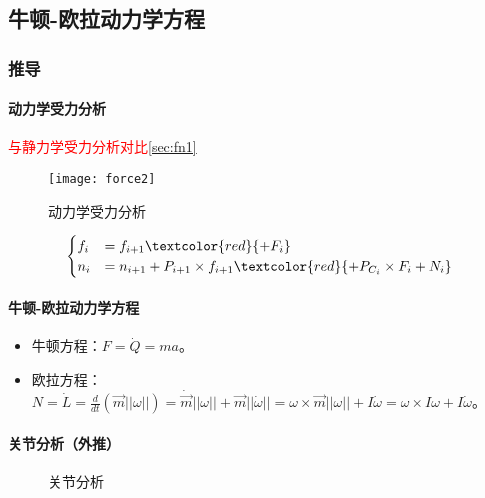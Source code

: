 \documentclass[
12pt, %
a4paper, 
oneside, %
headinclude,footinclude, %
]{scrartcl}
\begin{document}
\subsection[牛顿-欧拉动力学方程]{牛顿-欧拉动力学方程}
\subsubsection[推导]{推导}
\paragraph{动力学受力分析}\label{sec:fn2}
\textcolor{red}{与静力学受力分析对比}\ref{sec:fn1}

\begin{figure}[H]
\centering 
\texttt{[image: force2]} 
\caption[动力学受力分析]{动力学受力分析}
\end{figure}

$$
\begin{cases}
f_i &= f_{i + 1} \textcolor{red}{+ F_i} \\
n_i &= n_{i + 1} + P_{i + 1} \times f_{i + 1} \textcolor{red}{+ P_{C_i} \times F_i + N_i} \\
\end{cases}
$$
\paragraph{牛顿-欧拉动力学方程}
\begin{itemize}
\item 牛顿方程：$ F = \dot{Q} = ma $。
\item 欧拉方程：$ N = \dot{L} = \frac{d}{dt}(\vec{m}||\omega||) = \dot{\vec{m}}||\omega|| + \vec{m}||\dot{\omega}|| = \omega \times \vec{m}||\omega|| + I\dot{\omega} = \omega \times I\omega + I\dot{\omega} $。
\end{itemize}
\paragraph{关节分析（外推）}
\begin{figure}[H]
\centering
{} \quad
{}
\caption[关节分析]{关节分析}
\end{figure}
\end{document}
